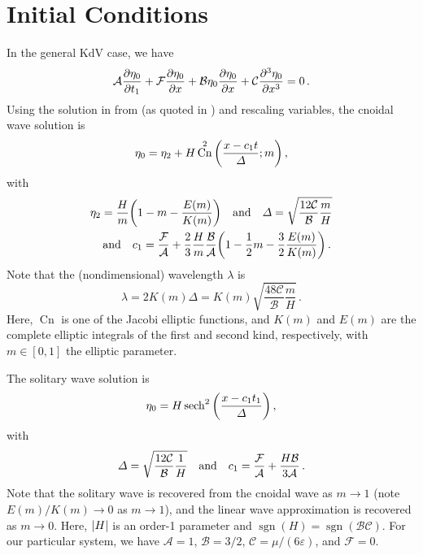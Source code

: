 \documentclass{jfm}
\DeclareMathOperator{\cn}{Cn}
\DeclareMathOperator{\sgn}{sgn}
\renewcommand*{\epsilon}{\varepsilon}
\begin{document}
\section{Initial Conditions}
In the general KdV case, we have
\begin{equation}
  \mathcal{A} \pdv{\eta_0}{t_1} + \mathcal{F} \pdv{\eta_0}{x} + \mathcal{B}
  \eta_0 \pdv{\eta_0}{x} + \mathcal{C} \pdv[3]{\eta_0}{x} = 0 \,.
\end{equation}
Using the solution in from \citet{dingemans1997water} (as quoted in
\citeauthor{brun2018convective}) and rescaling variables, the cnoidal
wave solution is
\begin{equation}
  \eta_0 = \eta_2 + H \cn^2\pqty{\frac{x-c_1 t}{\Delta}; m} \,,
\end{equation}
with
\begin{gather}
  \eta_2 = \frac{H}{m} \pqty{1 - m - \frac{E(m)}{K(m)}}
  \qq{and}
  \Delta = \sqrt{\frac{12 \mathcal{C}}{\mathcal{B}} \frac{m}{H}}
  \label{eq:nondim_cnoidal_params}
  \\
  \qq{and}
  c_1 = \frac{\mathcal{F}}{\mathcal{A}} + \frac{2}{3} \frac{H}{m}
  \frac{\mathcal{B}}{\mathcal{A}} \pqty{1 - \frac{1}{2} m - \frac{3}{2}
    \frac{E(m)}{K(m)}} \,.
\end{gather}
Note that the (nondimensional) wavelength $\lambda$ is
\begin{equation}
  \lambda = 2 K(m) \Delta = K(m) \sqrt{\frac{48
  \mathcal{C}}{\mathcal{B}} \frac{m}{H}} \,.
  \label{eq:nondim_lambda}
\end{equation}
Here, $\cn$ is one of the Jacobi elliptic functions, and $K(m)$ and
$E(m)$ are the complete elliptic integrals of the first and second kind,
respectively, with $m \in [0,1]$ the elliptic parameter.

The solitary wave solution is
\begin{equation}
  \eta_0 = H \sech^2\pqty{\frac{x - c_1 t_1}{\Delta}} \,,
\end{equation}
with
\begin{equation}
  \Delta = \sqrt{\frac{12 \mathcal{C}}{\mathcal{B}} \frac{1}{H}}
  \qq{and}
  c_1 = \frac{\mathcal{F}}{\mathcal{A}} + \frac{H \mathcal{B}}{3
    \mathcal{A}} \,.
\end{equation}
Note that the solitary wave is recovered from the cnoidal wave as $m \to
1$ (note $E(m)/K(m) \to 0$ as $m \to 1$), and the linear wave
approximation is recovered as $m \to 0$.
Here, $\abs{H}$ is an order-1 parameter and $\sgn(H) = \sgn(\mathcal{B}
\mathcal{C})$.
For our particular system, we have $\mathcal{A} = 1$, $\mathcal{B} =
3/2$, $\mathcal{C} = \mu/(6\epsilon)$, and $\mathcal{F} = 0$.
\end{document}
